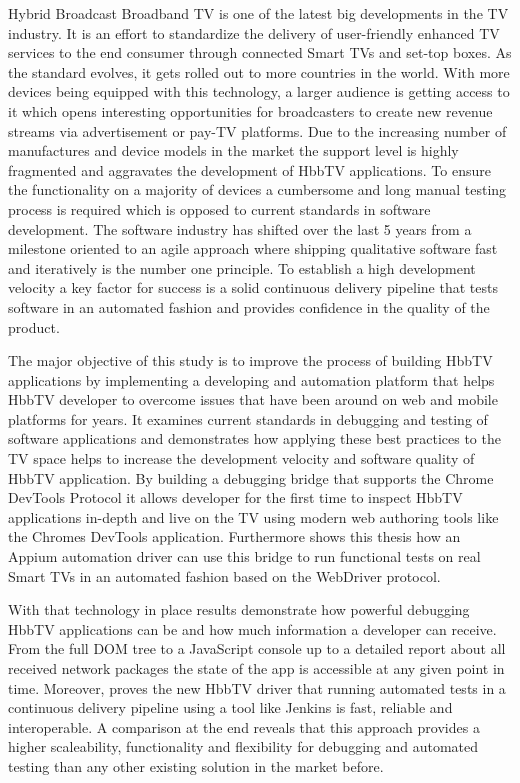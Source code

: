 Hybrid Broadcast Broadband TV is one of the latest big developments in the TV industry. It is an effort to standardize the delivery of user-friendly enhanced TV services to the end consumer through connected Smart TVs and set-top boxes. As the standard evolves, it gets rolled out to more countries in the world. With more devices being equipped with this technology, a larger audience is getting access to it which opens interesting opportunities for broadcasters to create new revenue streams via advertisement or pay-TV platforms. Due to the increasing number of manufactures and device models in the market the support level is highly fragmented and aggravates the development of HbbTV applications. To ensure the functionality on a majority of devices a cumbersome and long manual testing process is required which is opposed to current standards in software development. The software industry has shifted over the last 5 years from a milestone oriented to an agile approach where shipping qualitative software fast and iteratively is the number one principle. To establish a high development velocity a key factor for success is a solid continuous delivery pipeline that tests software in an automated fashion and provides confidence in the quality of the product.

The major objective of this study is to improve the process of building HbbTV applications by implementing a developing and automation platform that helps HbbTV developer to overcome issues that have been around on web and mobile platforms for years. It examines current standards in debugging and testing of software applications and demonstrates how applying these best practices to the TV space helps to increase the development velocity and software quality of HbbTV application. By building a debugging bridge that supports the Chrome DevTools Protocol it allows developer for the first time to inspect HbbTV applications in-depth and live on the TV using modern web authoring tools like the Chromes DevTools application. Furthermore shows this thesis how an Appium automation driver can use this bridge to run functional tests on real Smart TVs in an automated fashion based on the WebDriver protocol.

With that technology in place results demonstrate how powerful debugging HbbTV applications can be and how much information a developer can receive. From the full DOM tree to a JavaScript console up to a detailed report about all received network packages the state of the app is accessible at any given point in time. Moreover, proves the new HbbTV driver that running automated tests in a continuous delivery pipeline using a tool like Jenkins is fast, reliable and interoperable. A comparison at the end reveals that this approach provides a higher scaleability, functionality and flexibility for debugging and automated testing than any other existing solution in the market before.
